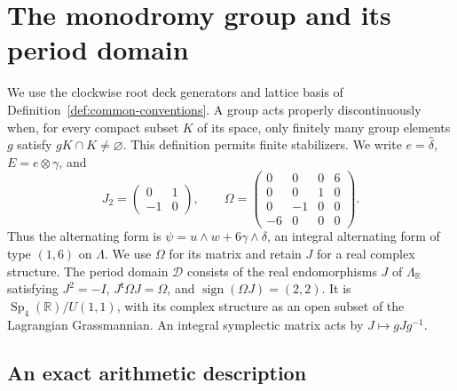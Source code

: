 \section{The monodromy group and its period domain}\hypertarget{tag-01PV}{}\label{fam:section:F}

\begin{definition}\hypertarget{tag-IP01}{}\label{I:def:period-domain}
We use the clockwise root deck generators and lattice basis of
Definition~\ref{def:common-conventions}. A group acts properly
discontinuously when, for every
compact subset $K$ of its space, only finitely many group elements $g$ satisfy
$gK\cap K\ne\varnothing$.  This definition permits finite stabilizers.  We
write $e=\widehat\delta$, $E=e\otimes\gamma$, and
\[
 J_2=\begin{pmatrix}0&1\\-1&0\end{pmatrix},\qquad
 \Omega=\begin{pmatrix}
 0&0&0&6\\0&0&1&0\\0&-1&0&0\\-6&0&0&0
 \end{pmatrix}.
\]
Thus the alternating form is
$\psi=u\wedge w+6\gamma\wedge\delta$, an integral alternating form of
type $(1,6)$ on $\Lambda$.  We use $\Omega$ for its matrix and retain $J$ for
a real complex structure.  The period domain $\mathcal D$ consists of the real
endomorphisms $J$ of $\Lambda_{\mathbb R}$ satisfying
$J^2=-I$, $J^{\mathsf t}\Omega J=\Omega$, and
$\operatorname{sign}(\Omega J)=(2,2)$.  It is
$\operatorname{Sp}_4(\mathbb R)/U(1,1)$, with its complex structure as an
open subset of the Lagrangian Grassmannian.  An integral symplectic matrix
acts by $J\mapsto gJg^{-1}$.
\end{definition}

\subsection{An exact arithmetic description}\hypertarget{tag-01PW}{}\label{fam:section:F.1}

